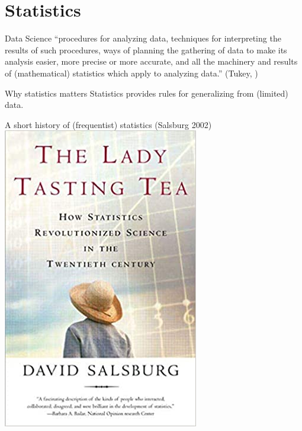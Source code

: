 \documentclass[
  ignorenonframetext,
  aspectratio=1610,
]{beamer}
\begin{document}
\hypertarget{statistics}{%
\section{Statistics}\label{statistics}}

\begin{frame}{Data Science}
\protect\hypertarget{data-science}{}
``procedures for analyzing data, techniques for interpreting the results
of such procedures, ways of planning the gathering of data to make its
analysis easier, more precise or more accurate, and all the machinery
and results of (mathematical) statistics which apply to analyzing
data.'' (Tukey, )
\end{frame}

\begin{frame}{Why statistics matters}
\protect\hypertarget{why-statistics-matters}{}
Statistics provides rules for generalizing from (limited) data.
\end{frame}

\begin{frame}{A short history of (frequentist) statistics (Salsburg
2002)}
\protect\hypertarget{a-short-history-of-frequentist-statistics-salsburg-2002}{}
\includegraphics{exhibit/lady-tasting-tea.jpg}
\end{frame}
\end{document}
